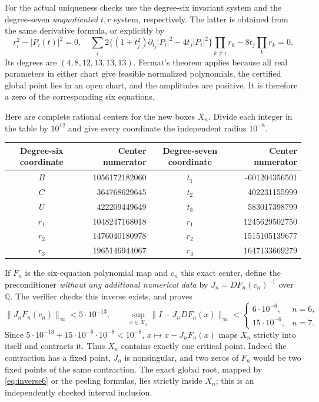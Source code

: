 \documentclass[11pt]{article}
\newcommand{\Q}{\mathbb Q}
\begin{document}
For the actual uniqueness checks use the degree-six invariant system and
the degree-seven \emph{unquotiented} $t,r$ system, respectively. The latter
is obtained from the same derivative formula, or explicitly by
\begin{equation}\label{eq:unquotient-gradient}
 r_i^2-|P_i(t)|^2=0,\quad
 \sum_i2\{(1+t_j^2)\partial_{t_j}|P_i|^2-4t_j|P_i|^2\}
          \prod_{k\ne i}r_k-8t_j\prod_kr_k=0.
\end{equation}
Its degrees are $(4,8,12,13,13,13)$. Fermat's theorem applies because
all real parameters in either chart give feasible normalized polynomials,
the certified global point lies in an open chart, and the amplitudes are
positive. It is therefore a zero of the corresponding six equations.

Here are complete rational centers for the new boxes $X_n$.
Divide each integer in the table by $10^{12}$ and give every coordinate
the independent radius $10^{-8}$.
\begin{center}\small
\begin{tabular}{c|r|c|r}
\toprule Degree-six coordinate&Center numerator&Degree-seven coordinate&Center numerator\\\midrule
$B$&1056172182060&$t_1$&-601204356501\\
$C$&364768629645&$t_2$&402231155999\\
$U$&422209449649&$t_3$&583017398799\\
$r_1$&1048247168018&$r_1$&1245629502750\\
$r_2$&1476040180978&$r_2$&1515105139677\\
$r_3$&1965146944067&$r_3$&1647133669279\\\bottomrule
\end{tabular}
\end{center}
If $F_n$ is the six-equation polynomial map and $c_n$ this exact center,
define the preconditioner \emph{without any additional numerical data} by
$J_n=DF_n(c_n)^{-1}$ over $\Q$. The verifier checks this inverse exists,
and proves
\begin{equation}\label{eq:printed-box-bounds}
 \|J_nF_n(c_n)\|_\infty<5\cdot10^{-13},\qquad
 \sup_{x\in X_n}\|I-J_nDF_n(x)\|_\infty<
 \begin{cases}6\cdot10^{-6},&n=6,\\15\cdot10^{-6},&n=7.\end{cases}
\end{equation}
Since $5\cdot10^{-13}+15\cdot10^{-6}\cdot10^{-8}<10^{-8}$,
$x\mapsto x-J_nF_n(x)$ maps $X_n$ strictly into itself and contracts it.
Thus $X_n$ contains exactly one critical point. Indeed the contraction
has a fixed point, $J_n$ is nonsingular, and two zeros of $F_n$ would
be two fixed points of the same contraction. The exact global root,
mapped by \eqref{eq:inverse6} or the peeling formulas, lies strictly
inside $X_n$; this is an independently checked interval inclusion.
\end{document}

